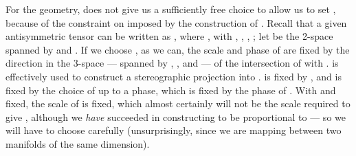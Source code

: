 \documentclass[a4paper,twocolumn,showpacs,preprintnumbers,aps]{revtex4}
\begin{document}
For the geometry, \myHighlight{$\chi$}\coordHE{} does not give us a sufficiently free choice to allow us to set
\coordHE{}, because of the constraint on
\coordHE{} imposed by the construction of \coordHE{}. Recall that a given
antisymmetric tensor \coordHE{} can be written as
\coordHE{}, where \coordHE{}, with
\coordHE{}, \coordHE{}, \coordHE{}, \coordHE{};
let \myHighlight{$\TZ$}\coordHE{} be the 2-space spanned by \coordHE{} and \coordHE{}.
If we choose \myHighlight{$\overline{\chi}\gamma^\mu\chi\in \TZ$}\coordHE{}, as we can, the scale and phase of
\myHighlight{$\xi$}\coordHE{} are fixed by the direction in the 3-space \coordHE{} --- spanned by
\coordHE{},
\coordHE{}, and
\coordHE{} ---
of the intersection \coordHE{} of \myHighlight{$\TZ$}\coordHE{} with \coordHE{}. \myHighlight{$\xi$}\coordHE{} is effectively used to construct a
stereographic projection into \coordHE{}. \coordHE{} is fixed by \myHighlight{$\xi$}\coordHE{}, and \coordHE{} is
fixed by the choice of \myHighlight{$\overline{\chi}\gamma^\mu\chi$}\coordHE{} up to a phase, which is fixed by the
phase of \myHighlight{$(\kappa,\lambda)$}\coordHE{}. With \coordHE{} and \coordHE{} fixed, the scale
of \coordHE{}
is fixed, which almost certainly will not be the scale required to give
\coordHE{}, although we \emph{have} succeeded in constructing
\coordHE{} to be proportional to \coordHE{} --- so we will have to choose
\myHighlight{$\overline{\chi}\gamma^\mu\chi\in \TZ$}\coordHE{} carefully (unsurprisingly, since we are mapping
between two manifolds of the same dimension).
\end{document}
